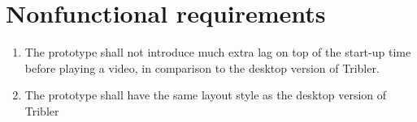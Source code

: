 \section{Nonfunctional requirements}

\begin{enumerate}
\item The prototype shall not introduce much extra lag on top of the start-up time before playing a video, in comparison to the desktop version of Tribler.

\item The prototype shall have the same layout style as the desktop version of Tribler

\end{enumerate}